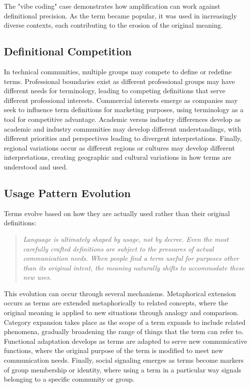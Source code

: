 \documentclass[11pt]{article}
\begin{document}
The "vibe coding" case demonstrates how amplification can work against definitional precision. As the term became popular, it was used in increasingly diverse contexts, each contributing to the erosion of the original meaning.

\subsection{Definitional Competition}

In technical communities, multiple groups may compete to define or redefine terms. Professional boundaries exist as different professional groups may have different needs for terminology, leading to competing definitions that serve different professional interests. Commercial interests emerge as companies may seek to influence term definitions for marketing purposes, using terminology as a tool for competitive advantage. Academic versus industry differences develop as academic and industry communities may develop different understandings, with different priorities and perspectives leading to divergent interpretations. Finally, regional variations occur as different regions or cultures may develop different interpretations, creating geographic and cultural variations in how terms are understood and used.

\subsection{Usage Pattern Evolution}

Terms evolve based on how they are actually used rather than their original definitions:

\begin{quote}
\emph{Language is ultimately shaped by usage, not by decree. Even the most carefully crafted definitions are subject to the pressures of actual communication needs. When people find a term useful for purposes other than its original intent, the meaning naturally shifts to accommodate these new uses.}
\end{quote}

This evolution can occur through several mechanisms. Metaphorical extension occurs as terms are extended metaphorically to related concepts, where the original meaning is applied to new situations through analogy and comparison. Category expansion takes place as the scope of a term expands to include related phenomena, gradually broadening the range of things that the term can refer to. Functional adaptation develops as terms are adapted to serve new communicative functions, where the original purpose of the term is modified to meet new communication needs. Finally, social signaling emerges as terms become markers of group membership or identity, where using a term in a particular way signals belonging to a specific community or group.
\end{document}
